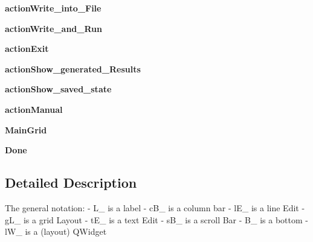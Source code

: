 \begin{DoxyCompactItemize}
\item 
\hypertarget{classPKPgui_1_1Ui__PKP_abfb09f482350ed76f287125e907d9fd8}{{\bfseries action\-Write\-\_\-into\-\_\-\-File}}\label{classPKPgui_1_1Ui__PKP_abfb09f482350ed76f287125e907d9fd8}

\item 
\hypertarget{classPKPgui_1_1Ui__PKP_ac0ee30233bf149005a25c443546573d8}{{\bfseries action\-Write\-\_\-and\-\_\-\-Run}}\label{classPKPgui_1_1Ui__PKP_ac0ee30233bf149005a25c443546573d8}

\item 
\hypertarget{classPKPgui_1_1Ui__PKP_a3d27b3e621e489ebd9186a7d01402733}{{\bfseries action\-Exit}}\label{classPKPgui_1_1Ui__PKP_a3d27b3e621e489ebd9186a7d01402733}

\item 
\hypertarget{classPKPgui_1_1Ui__PKP_ae6e80bc6c5afa2911c147c3d5c1fa461}{{\bfseries action\-Show\-\_\-generated\-\_\-\-Results}}\label{classPKPgui_1_1Ui__PKP_ae6e80bc6c5afa2911c147c3d5c1fa461}

\item 
\hypertarget{classPKPgui_1_1Ui__PKP_a5791257ed6951ffb8f0ef4df293ccba6}{{\bfseries action\-Show\-\_\-saved\-\_\-state}}\label{classPKPgui_1_1Ui__PKP_a5791257ed6951ffb8f0ef4df293ccba6}

\item 
\hypertarget{classPKPgui_1_1Ui__PKP_a46227a4278aee7b259a0d1be973d6fab}{{\bfseries action\-Manual}}\label{classPKPgui_1_1Ui__PKP_a46227a4278aee7b259a0d1be973d6fab}

\item 
\hypertarget{classPKPgui_1_1Ui__PKP_a7e90c99d49c88c725e4c12247c4dbfcc}{{\bfseries \-Main\-Grid}}\label{classPKPgui_1_1Ui__PKP_a7e90c99d49c88c725e4c12247c4dbfcc}

\item 
\hypertarget{classPKPgui_1_1Ui__PKP_ada1fa4ba5e1f294ee884211cb70fed43}{{\bfseries \-Done}}\label{classPKPgui_1_1Ui__PKP_ada1fa4ba5e1f294ee884211cb70fed43}

\end{DoxyCompactItemize}


\subsection{\-Detailed \-Description}
\begin{DoxyVerb}The general notation:
    - L_ is a label
    - cB_ is a column bar
    - lE_ is a line Edit
    - gL_ is a grid Layout
    - tE_ is a text Edit
    - sB_ is a scroll Bar
    - B_ is a bottom
    - lW_ is a (layout) QWidget
    \end{DoxyVerb}
 

